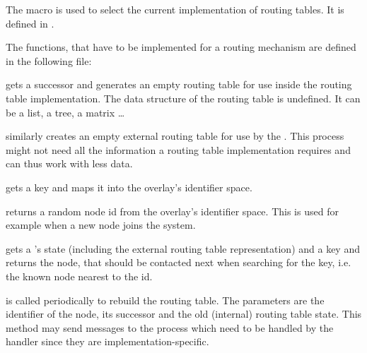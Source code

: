 The macro  is used to select the current implementation of routing
tables. It is defined in .


The functions, that have to be implemented for a routing mechanism are
defined in the following file:


\begin{description}
\setlength{\parskip}{0pt}
\setlength{\itemsep}{0pt}
\item {} gets a successor and generates an empty routing
  table for use inside the routing table implementation. The data structure of
  the routing table is undefined. It can be a list, a tree, a matrix \ldots

\item {} similarly creates an empty external routing table
  for use by the . This process might not need all the
  information a routing table implementation requires and can thus work with
  less data.

\item {} gets a key and maps it into the overlay's
  identifier space.

\item {} returns a random node id from the
  overlay's identifier space. This is used for example when a new node
  joins the system.

\item {} gets a 's state (including the
  external routing table representation) and a key and returns the node, that
  should be contacted next when searching for the key, i.e. the known node
  nearest to the id.

\item {} is called periodically to rebuild the
  routing table. The parameters are the identifier of the node, its
  successor and the old (internal) routing table state. This method may send
  messages to the  process which need to be handled by
  the  handler since they are
  implementation-specific.


\end{description}
